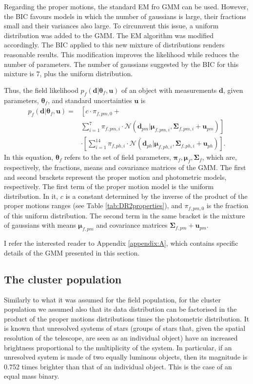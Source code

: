 Regarding the proper motions, the standard EM fro GMM can be used. However, the BIC favours models in which the number of gaussians is large, their fractions small and their variances also large. To circumvent this issue, a uniform distribution was added to the GMM. The EM algorithm was modified accordingly. The BIC applied to this new mixture of distributions renders reasonable results. This modification improves the likelihood while reduces the number of parameters. The number of gaussians suggested by the BIC for this mixture is 7, plus the uniform distribution. 

Thus, the field likelihood $p_f(\mathbf{d}|\boldsymbol{\theta}_f,\mathbf{u})$ of an object with measurements $\mathbf{d}$, given parameters, $\boldsymbol{\theta}_f$,  and standard uncertainties $\mathbf{u}$ is
\begin{align}
p_f(\mathbf{d}|\boldsymbol{\theta}_f,\mathbf{u})=&\left[ c\cdot\pi_{f,pm,0} + \nonumber \right. \\
&\left. \sum \limits_{i=1}^{7}\pi_{f,pm,i}\cdot \mathcal{N}(\mathbf{d}_{pm} | \boldsymbol{\mu}_{f,pm,i},\boldsymbol{\Sigma}_{f,pm,i}+\mathbf{u}_{pm})\right] \nonumber \\ 
&\cdot \left[ \sum \limits_{i=1}^{14}\pi_{f,ph,i}\cdot \mathcal{N}(\mathbf{d}_{ph} | \boldsymbol{\mu}_{f,ph,i},\boldsymbol{\Sigma}_{f,ph,i}+\mathbf{u}_{ph})\right].
\label{eq:field}
\end{align}
In this equation, $\boldsymbol{\theta}_f$ refers to the set of field parameters, $\boldsymbol{\pi}_f,\boldsymbol{\mu}_f,\boldsymbol{\Sigma}_f$, which are, respectively, the fractions, means and covariance matrices of the GMM. The first and second brackets represent the proper motion and photometric models, respectively. The first term of the proper motion model is the uniform distribution. In it, $c$ is a constant determined by the inverse of the product of the proper motions ranges (see Table \ref{tab:DR2properties}), and $\pi_{f,pm,0}$ is the fraction of this uniform distribution. The second term in the same bracket is the mixture of gaussians with means $\boldsymbol{\mu}_{f,pm}$ and covariance matrices $\boldsymbol{\Sigma}_{f,pm} +\mathbf{u}_{pm}$. 

I refer the interested reader to Appendix \ref{appendix:A}, which contains specific details of the GMM presented in this section.

\subsection{The cluster population}
\label{subsect:cluster}
Similarly to what it was assumed for the field population, for the cluster population we assumed also that its data distribution can be factorised in the product of the proper motions distributions times the photometric distribution. It is known that unresolved systems of stars (groups of stars that, given the spatial resolution of the telescope, are seen as an individual object) have an increased brightness proportional to the multiplicity of the system. In particular, if an unresolved system is made of two equally luminous objects, then its magnitude is 0.752 times brighter than that of an individual object. This is the case of an equal mass binary.

